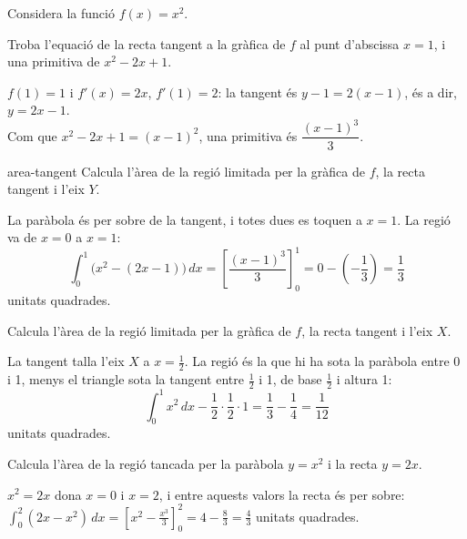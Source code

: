 Considera la funció $f(x)=x^2$.

\begin{apartats}

Troba l'equació de la recta tangent a la gràfica de $f$ al punt d'abscissa $x=1$, i una primitiva de
$x^2-2x+1$.

\begin{solucio}
$f(1)=1$ i $f'(x)=2x$, $f'(1)=2$: la tangent és $y-1=2(x-1)$, és a dir, $y=2x-1$.\\
Com que $x^2-2x+1=(x-1)^2$, una primitiva és $\dfrac{(x-1)^3}3$.
\end{solucio}

\begin{tria}{area-tangent}
Calcula l'àrea de la regió limitada per la gràfica de $f$, la recta tangent i l'eix $Y$.

\begin{solucio}
La paràbola és per sobre de la tangent, i totes dues es toquen a $x=1$. La regió va de $x=0$ a $x=1$:
\[
\int_0^1\bigl(x^2-(2x-1)\bigr)\,dx=\left[\frac{(x-1)^3}3\right]_0^1=0-\left(-\frac13\right)=\frac13
\]
unitats quadrades.
\end{solucio}

Calcula l'àrea de la regió limitada per la gràfica de $f$, la recta tangent i l'eix $X$.

\begin{solucio}
La tangent talla l'eix $X$ a $x=\frac12$. La regió és la que hi ha sota la paràbola entre 0 i 1, menys
el triangle sota la tangent entre $\frac12$ i 1, de base $\frac12$ i altura 1:
\[
\int_0^1x^2\,dx-\frac12\cdot\frac12\cdot1=\frac13-\frac14=\frac1{12}
\]
unitats quadrades.
\end{solucio}
\end{tria}

\begin{nomesllarg}
Calcula l'àrea de la regió tancada per la paràbola $y=x^2$ i la recta $y=2x$.

\begin{solucio}
$x^2=2x$ dona $x=0$ i $x=2$, i entre aquests valors la recta és per sobre:
$\displaystyle\int_0^2(2x-x^2)\,dx=\left[x^2-\frac{x^3}3\right]_0^2=4-\frac83=\frac43$ unitats quadrades.
\end{solucio}
\end{nomesllarg}

\end{apartats}
